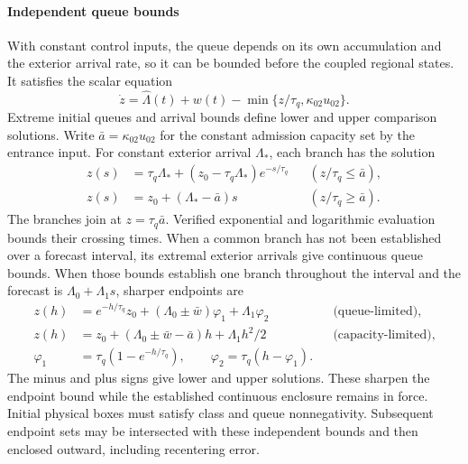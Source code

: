 \documentclass[preprint,12pt]{elsarticle}
\theoremstyle{definition}
\theoremstyle{plain}
\theoremstyle{definition}
\theoremstyle{plain}
\begin{document}
\paragraph{Independent queue bounds}
With constant control inputs, the queue depends on its own accumulation and
the exterior arrival rate, so it can be bounded before the coupled
regional states. It satisfies the scalar equation
\begin{equation}
 \dot z=\widehat\Lambda(t)+w(t)-\min\{z/\tau_q,\kappa_{02}u_{02}\}.
 \label{eq:structure-scalar-queue}
\end{equation}
Extreme initial queues and arrival bounds define lower and upper
comparison solutions. Write $\bar a=\kappa_{02}u_{02}$ for the constant
admission capacity set by the entrance input. For constant exterior arrival
$\Lambda_*$, each branch has the solution
\begin{equation}
 \begin{aligned}
 z(s)&=\tau_q\Lambda_*+(z_0-\tau_q\Lambda_*)e^{-s/\tau_q}
       &&(z/\tau_q\le\bar a),\\
 z(s)&=z_0+(\Lambda_*-\bar a)s&&(z/\tau_q\ge\bar a).
 \end{aligned}
 \label{eq:structure-queue-flows}
\end{equation}
The branches join at $z=\tau_q\bar a$. Verified exponential and logarithmic
evaluation bounds their crossing times. When a common branch has not
been established over a forecast interval, its extremal exterior arrivals
give continuous queue bounds. When those bounds establish one branch throughout the
interval and the forecast is $\Lambda_0+\Lambda_1s$, sharper endpoints are
\begin{equation}
\begin{aligned}
 z(h)&=e^{-h/\tau_q}z_0+(\Lambda_0\pm\bar w)\varphi_1+\Lambda_1\varphi_2
       &&\text{(queue-limited)},\\
 z(h)&=z_0+(\Lambda_0\pm\bar w-\bar a)h+\Lambda_1h^2/2
       &&\text{(capacity-limited)},\\
 \varphi_1&=\tau_q(1-e^{-h/\tau_q}),\qquad
 \varphi_2=\tau_q(h-\varphi_1).
\end{aligned}
\label{eq:structure-affine-queue}
\end{equation}
The minus and plus signs give lower and upper solutions. These sharpen
the endpoint bound while the established continuous enclosure remains
in force. Initial physical boxes must satisfy class and queue
nonnegativity. Subsequent endpoint sets may be intersected with these
independent bounds and then enclosed outward, including recentering error.
\end{document}
